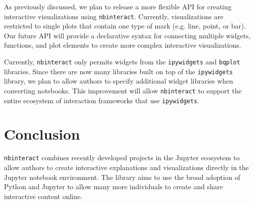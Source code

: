 \documentclass[nobib]{tufte-handout}
\newcommand{\code}[1]{\texttt{#1}}
\begin{document}
As previously discussed, we plan to release a more flexible API for creating
interactive visualizations using \code{nbinteract}. Currently, visualizations
are restricted to single plots that contain one type of mark (e.g. line, point,
or bar). Our future API will provide a declarative syntax for connecting
multiple widgets, functions, and plot elements to create more complex
interactive visualizations.

Currently, \code{nbinteract} only permits widgets from the \code{ipywidgets}
and \code{bqplot} libraries. Since there are now many libraries built on top of
the \code{ipywidgets} library, we plan to allow authors to
specify additional widget libraries when converting notebooks. This improvement
will allow \code{nbinteract} to support the entire ecosystem of interaction
frameworks that use \code{ipywidgets}.



\section{Conclusion} %
\label{sec:conclusion}

\code{nbinteract} combines recently developed projects in the Jupyter ecosystem
to allow authors to create interactive explanations and visualizations directly
in the Jupyter notebook environment. The library aims to use the broad adoption
of Python and Jupyter to allow many more individuals to create and share
interactive content online.


\printbibliography
\end{document}
